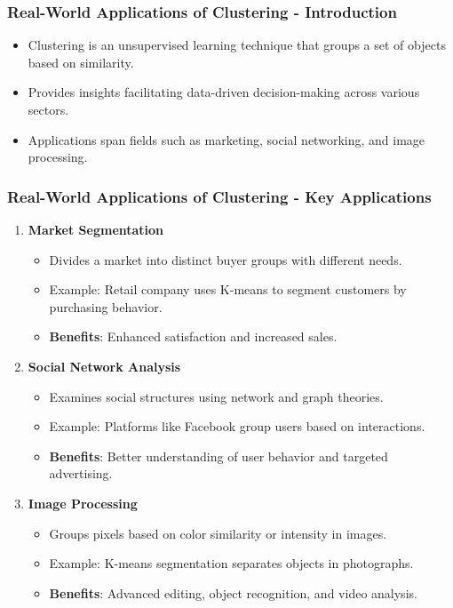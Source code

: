 \documentclass{beamer}
\begin{document}
\begin{frame}[fragile]
    \frametitle{Real-World Applications of Clustering - Introduction}
    \begin{itemize}
        \item Clustering is an unsupervised learning technique that groups a set of objects based on similarity.
        \item Provides insights facilitating data-driven decision-making across various sectors.
        \item Applications span fields such as marketing, social networking, and image processing.
    \end{itemize}
\end{frame}

\begin{frame}[fragile]
    \frametitle{Real-World Applications of Clustering - Key Applications}
    \begin{enumerate}
        \item \textbf{Market Segmentation}
            \begin{itemize}
                \item Divides a market into distinct buyer groups with different needs.
                \item Example: Retail company uses K-means to segment customers by purchasing behavior.
                \item \textbf{Benefits}: Enhanced satisfaction and increased sales.
            \end{itemize}
        
        \item \textbf{Social Network Analysis}
            \begin{itemize}
                \item Examines social structures using network and graph theories.
                \item Example: Platforms like Facebook group users based on interactions.
                \item \textbf{Benefits}: Better understanding of user behavior and targeted advertising.
            \end{itemize}

        \item \textbf{Image Processing}
            \begin{itemize}
                \item Groups pixels based on color similarity or intensity in images.
                \item Example: K-means segmentation separates objects in photographs.
                \item \textbf{Benefits}: Advanced editing, object recognition, and video analysis.
            \end{itemize}
    \end{enumerate}
\end{frame}
\end{document}
